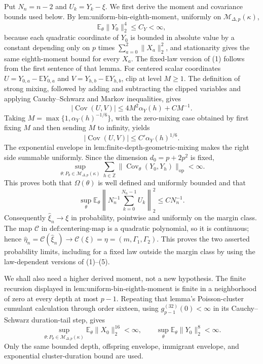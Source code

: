Put \(N_n=n-2\) and \(U_k=Y_k-\xi\).  We first derive the moment and covariance bounds used below.  By \(\text{lem:uniform-bin-eighth-moment}\), uniformly on \(\mathcal M_{\Delta,p}(\kappa)\),
\[
 \mathbb E_\theta\lVert Y_0\rVert_2^4\leq C_Y<\infty,
\tag{1}
\]
because each quadratic coordinate of \(Y_0\) is bounded in absolute value by a constant depending only on \(p\) times \(\sum_{a=0}^2\lVert X_a\rVert_2^2\), and stationarity gives the same eighth-moment bound for every \(X_a\).  The fixed-law version of (1) follows from the first sentence of that lemma.  For centered scalar coordinates \(U=Y_{0,a}-\mathbb EY_{0,a}\) and \(V=Y_{h,b}-\mathbb EY_{h,b}\), clip at level \(M\geq1\).  The definition of strong mixing, followed by adding and subtracting the clipped variables and applying Cauchy--Schwarz and Markov inequalities, gives
\[
 |\operatorname{Cov}(U,V)|
 \leq4M^2\alpha_Y(h)+C M^{-1}.
\tag{2}
\]
Taking \(M=\max\{1,\alpha_Y(h)^{-1/6}\}\), with the zero-mixing case obtained by first fixing \(M\) and then sending \(M\) to infinity, yields
\[
 |\operatorname{Cov}(U,V)|\leq C'\alpha_Y(h)^{1/6}.
\tag{3}
\]
The exponential envelope in \(\text{lem:finite-depth-geometric-mixing}\) makes the right side summable uniformly.  Since the dimension \(d_0=p+2p^2\) is fixed,
\[
 \sup_{\theta:P_\theta\in\mathcal M_{\Delta,p}(\kappa)}
 \sum_{h\in\mathbb Z}\lVert\operatorname{Cov}_\theta(Y_0,Y_h)\rVert_{\mathrm{op}}<\infty.
\tag{4}
\]
This proves both that \(\Omega(\theta)\) is well defined and uniformly bounded and that
\[
 \sup_\theta\mathbb E_\theta
 \left\lVert N_n^{-1}\sum_{k=0}^{N_n-1}U_k\right\rVert_2^2
 \leq C N_n^{-1}.
\tag{5}
\]
Consequently \(\widehat\xi_n\to\xi\) in probability, pointwise and uniformly on the margin class.  The map \(\mathcal C\) in \(\text{def:centering-map}\) is a quadratic polynomial, so it is continuous; hence \(\widehat\eta_n=\mathcal C(\widehat\xi_n)\to\mathcal C(\xi)=\eta=(m,\Gamma_1,\Gamma_2)\).  This proves the two asserted probability limits, including for a fixed law outside the margin class by using the law-dependent versions of (1)--(5).

We shall also need a higher derived moment, not a new hypothesis.  The finite recursion displayed in \(\text{lem:uniform-bin-eighth-moment}\) is finite in a neighborhood of zero at every depth at most \(p-1\).  Repeating that lemma's Poisson-cluster cumulant calculation through order sixteen, using \(g_{p-1}^{(32)}(0)<\infty\) in its Cauchy--Schwarz duration-tail step, gives
\[
 \sup_{\theta:P_\theta\in\mathcal M_{\Delta,p}(\kappa)}
 \mathbb E_\theta\lVert X_0\rVert_2^{16}<\infty,
 \qquad
 \sup_\theta\mathbb E_\theta\lVert Y_0\rVert_2^8<\infty.
\tag{6}
\]
Only the same bounded depth, offspring envelope, immigrant envelope, and exponential cluster-duration bound are used.

